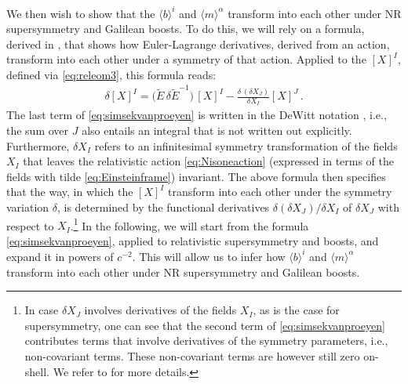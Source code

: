 \documentclass[a4paper,10pt,openany]{article}
\begin{document}
	We then wish to show that the $\langle b \rangle^i$ and $\langle m \rangle^\alpha$ transform into each other under NR supersymmetry and Galilean boosts. To do this, we will rely on a formula, derived in \cite{Vanhecke:2017chr}, that shows how Euler-Lagrange derivatives, derived from an action, transform into each other under a symmetry of that action. Applied to the $[X]^I$, defined via \eqref{eq:releom3}, this formula reads:
	\begin{align}\label{eq:simsekvanproeyen}
		\delta [X]^I = \big(\tilde{E}\,\delta \tilde{E}^{-1}\big)\,[X]^I - \frac{\delta\,(\delta X_J)}{\delta X_I} [X]^J\,.
	\end{align}
	The last term of \eqref{eq:simsekvanproeyen} is written in the DeWitt notation \cite{DeWitt:1967ub}, i.e., the sum over $J$ also entails an integral that is not written out explicitly. Furthermore, $\delta X_I$ refers to an infinitesimal symmetry transformation of the fields $X_I$ that leaves the relativistic action \eqref{eq:Nisoneaction} (expressed in terms of the fields with tilde \eqref{eq:Einsteinframe}) invariant. The above formula then specifies that the way, in which the $[X]^I$ transform into each other under the symmetry variation $\delta$, is determined by the functional derivatives $\delta (\delta X_J)/\delta X_I$ of $\delta X_J$ with respect to $X_I$.\footnote{In case $\delta X_J$ involves derivatives of the fields $X_I$, as is the case for supersymmetry, one can see that the second term of \eqref{eq:simsekvanproeyen} contributes terms that involve derivatives of the symmetry parameters, i.e., non-covariant terms. These non-covariant terms are however still zero on-shell. We refer to \cite{Vanhecke:2017chr} for more details.} In the following, we will start from the formula \eqref{eq:simsekvanproeyen}, applied to relativistic supersymmetry and boosts, and expand it in powers of $c^{-2}$. This will allow us to infer how $\langle b \rangle^i$ and $\langle m \rangle^\alpha$ transform into each other under NR supersymmetry and Galilean boosts.
	
\end{document}
